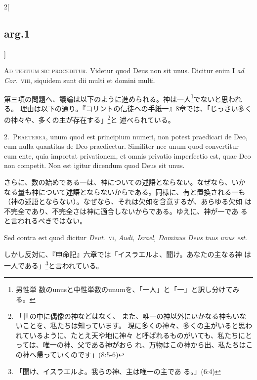 \documentclass[paper=a4paper,fontsize=10pt,jafontsize=9pt,titlepage]{jlreq}
\begin{document}
\begin{paracol}{2}[\subsection{arg.1}]

{\huge A}{\scshape d tertium sic proceditur}. Videtur quod Deus non sit
 unus. Dicitur enim I {\itshape ad Cor}.~{\scshape viii}, siquidem sunt dii multi et domini multi.

\switchcolumn

第三項の問題へ、議論は以下のように進められる。神は一人\footnote{男性単
 数のunusと中性単数のunumを、「一人」と「一」と訳し分けてみる。}でないと思われる。
 理由は以下の通り。『コリントの信徒への手紙一』8章では、「じっさい多く
 の神々や、多くの主が存在する」\footnote{「世の中に偶像の神などはなく、
 また、唯一の神以外にいかなる神もいないことを、私たちは知っています。
 現に多くの神々、多くの主がいると思われているように、たとえ天や地に神々
 と呼ばれるものがいても、私たちにとっては、唯一の神、父である神がおら
 れ、万物はこの神から出、私たちはこの神へ帰っていくのです」(8:5-6)}と
 述べられている。


2.~{\scshape Praeterea}, unum quod est principium numeri, non potest praedicari de
Deo, cum nulla quantitas de Deo praedicetur. Similiter nec unum quod
convertitur cum ente, quia importat privationem, et omnis privatio
imperfectio est, quae Deo non competit. Non est igitur dicendum quod
Deus sit unus.

\switchcolumn

さらに、数の始めである一は、神についての述語とならない。なぜなら、いか
なる量も神について述語とならないからである。同様に、有と置換される一も
（神の述語とならない）。なぜなら、それは欠如を含意するが、あらゆる欠如
は不完全であり、不完全さは神に適合しないからである。ゆえに、神が一であ
ると言われるべきではない。

\switchcolumn*

Sed contra est quod dicitur {\itshape Deut}.~{\scshape vi}, {\itshape Audi,
 Israel, Dominus Deus tuus unus est}.

\switchcolumn

しかし反対に、『申命記』六章では「イスラエルよ、聞け。あなたの主なる神
は一人である」\footnote{「聞け、イスラエルよ。我らの神、主は唯一の主であ
る。」(6:4)}と言われている。


\end{paracol}
\end{document}
